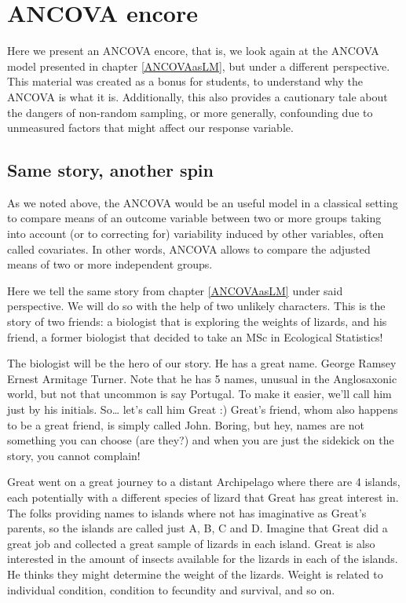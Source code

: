 \documentclass[
]{book}
\begin{document}
\hypertarget{ANCOVAe}{%
\section{ANCOVA encore}\label{ANCOVAe}}

Here we present an ANCOVA encore, that is, we look again at the ANCOVA model presented in chapter \ref{ANCOVAasLM}, but under a different perspective. This material was created as a bonus for students, to understand why the ANCOVA is what it is. Additionally, this also provides a cautionary tale about the dangers of non-random sampling, or more generally, confounding due to unmeasured factors that might affect our response variable.

\hypertarget{same-story-another-spin}{%
\subsection{Same story, another spin}\label{same-story-another-spin}}

As we noted above, the ANCOVA would be an useful model in a classical setting to compare means of an outcome variable between two or more groups taking into account (or to correcting for) variability induced by other variables, often called covariates. In other words, ANCOVA allows to compare the adjusted means of two or more independent groups.

Here we tell the same story from chapter \ref{ANCOVAasLM} under said perspective. We will do so with the help of two unlikely characters. This is the story of two friends: a biologist that is exploring the weights of lizards, and his friend, a former biologist that decided to take an MSc in Ecological Statistics!

The biologist will be the hero of our story. He has a great name. George Ramsey Ernest Armitage Turner. Note that he has 5 names, unusual in the Anglosaxonic world, but not that uncommon is say Portugal. To make it easier, we'll call him just by his initials. So\ldots{} let's call him Great :) Great's friend, whom also happens to be a great friend, is simply called John. Boring, but hey, names are not something you can choose (are they?) and when you are just the sidekick on the story, you cannot complain!

Great went on a great journey to a distant Archipelago where there are 4 islands, each potentially with a different species of lizard that Great has great interest in. The folks providing names to islands where not has imaginative as Great's parents, so the islands are called just A, B, C and D. Imagine that Great did a great job and collected a great sample of lizards in each island. Great is also interested in the amount of insects available for the lizards in each of the islands. He thinks they might determine the weight of the lizards. Weight is related to individual condition, condition to fecundity and survival, and so on.
\end{document}
